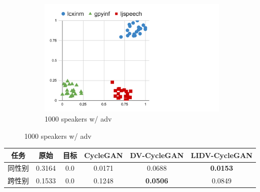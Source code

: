 \begin{figure}[!ht]
\begin{minipage}[b]{\linewidth}
\begin{subfigure}[b]{0.33\linewidth}
            \includegraphics[width=\linewidth,trim=0 0 200 0,clip]{figure/5_dvector23.pdf}
            \caption{1000 speakers w/ adv}
        \end{subfigure}   
    \end{minipage}

\end{figure}

\begin{table}
    \centering
    \begin{tabular}[t]{ cccccc }
        \toprule
        任务  & 原始 & 目标 & CycleGAN & DV-CycleGAN & LIDV-CycleGAN  \\
        \midrule
        同性别    &     0.3164 &  0.0 & 0.0171 & 0.0688 & \textbf{0.0153}           \\
        跨性别    &    0.1533 & 0.0 & 0.1248 & \textbf{0.0506} & 0.0849  \\
        \bottomrule
        \end{tabular} 
    \label{tab:f0f22}
\end{table}



